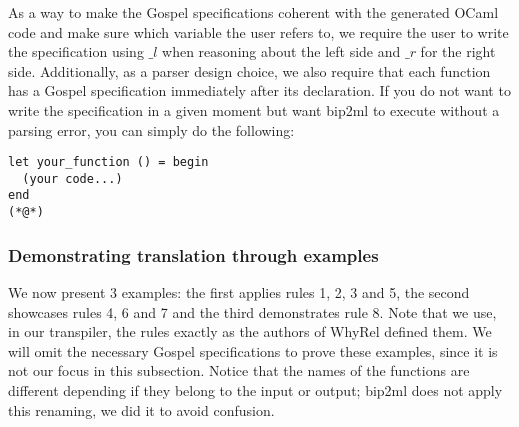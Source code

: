 As a way to make the Gospel specifications coherent with the generated OCaml code and make sure which variable the user refers to, we require the user to write the specification using $\_l$ when reasoning about the left side and $\_r$ for the right side.
Additionally, as a parser design choice, we also require that each function has a Gospel specification immediately after its declaration.
If you do not want to write the specification in a given moment but want bip2ml to execute without a parsing error, you can simply do the following:
\begin{lstlisting}[mathescape, basicstyle=\ttfamily, columns=flexible,
                    emph={type, and, let, rec, if, then, else, mod, in, for, while, do, done, to, begin, end, assert, match, with, of, open, include,ref},
                    emphstyle=\ttfamily\bfseries\color{myorange}]
let your_function () = begin
  (your code...)
end
(*@*)
\end{lstlisting}


\subsubsection{Demonstrating translation through examples}
\label{subsubsec:translator_printer_examples}

We now present 3 examples: the first applies rules 1, 2, 3 and 5, the second showcases rules 4, 6 and 7 and the third demonstrates rule 8.
Note that we use, in our transpiler, the rules exactly as the authors of WhyRel defined them. 
We will omit the necessary Gospel specifications to prove these examples, since it is not our focus in this subsection.
Notice that the names of the functions are different depending if they belong to the input or output; bip2ml does not apply this renaming, we did it to avoid confusion.

